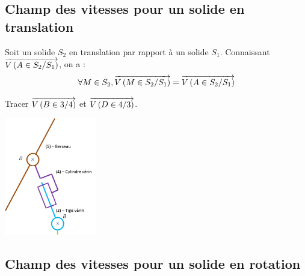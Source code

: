 \documentclass[10pt]{article}
\begin{document}
\subsection{Champ des vitesses pour un solide en translation}
\begin{resultat}
Soit un solide $S_2$ en translation par rapport à un solide $S_1$. Connaissant $\overrightarrow{V\left( {A} \in {S_2}/{S_1}\right)}$, on a :
$$
\forall M \in S_2, \overrightarrow{V\left( {M} \in {S_2}/{S_1}\right)} = \overrightarrow{V\left( {A} \in {S_2}/{S_1}\right)}
$$
\end{resultat}
\begin{exemple}

Tracer $\overrightarrow{V\left( {B} \in {3}/{4}\right)}$ et $\overrightarrow{V\left( {D} \in {4}/{3}\right)}$.

\begin{center}
\includegraphics[width=4cm]{images/verin}
\end{center}

\end{exemple}

\subsection{Champ des vitesses pour un solide en rotation}
\end{document}
